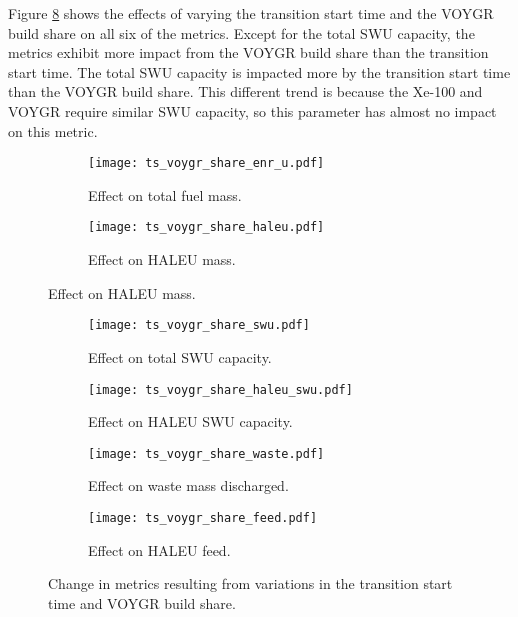 Figure \ref{fig:ts_voygr_share} shows the effects of varying the 
transition start time and the VOYGR build share on all six of the 
metrics. Except for the total \gls{SWU} capacity, the metrics 
exhibit more impact from the VOYGR build share than the 
transition start time. The total \gls{SWU} capacity is impacted more 
by the transition start time than the VOYGR build share. This
different trend is because the Xe-100 and VOYGR require similar 
\gls{SWU} capacity, so this parameter has almost no impact on 
this metric. 

\begin{figure}
    \begin{subfigure}[t]{0.48\textwidth}
        \centering
        \texttt{[image: ts\_voygr\_share\_enr\_u.pdf]}
        \caption{Effect on total fuel mass.}
        \label{fig:ts_voygr_share_enr_u}
    \end{subfigure}
    \hfill
    \begin{subfigure}[t]{0.48\textwidth}
        \centering
        \texttt{[image: ts\_voygr\_share\_haleu.pdf]}
        \caption{Effect on HALEU mass.}
        \label{fig:ts_voygr_share_haleu}
    \end{subfigure}
\end{figure}

\begin{figure}
    \ContinuedFloat
    \begin{subfigure}[t]{0.48\textwidth}
        \centering
        \texttt{[image: ts\_voygr\_share\_swu.pdf]}
        \caption{Effect on total SWU capacity.}
        \label{fig:ts_voygr_share_swu}
    \end{subfigure}
    \hfill
    \begin{subfigure}[t]{0.48\textwidth}
        \centering
        \texttt{[image: ts\_voygr\_share\_haleu\_swu.pdf]}
        \caption{Effect on HALEU SWU capacity.}
        \label{fig:ts_voygr_share_haleu_swu}
    \end{subfigure}
    
    \begin{subfigure}[t]{0.48\textwidth}
        \centering
        \texttt{[image: ts\_voygr\_share\_waste.pdf]}
        \caption{Effect on waste mass discharged.}
        \label{fig:ts_voygr_share_waste}
    \end{subfigure}
    \hfill
    \begin{subfigure}[t]{0.48\textwidth}
        \centering
        \texttt{[image: ts\_voygr\_share\_feed.pdf]}
        \caption{Effect on HALEU feed.}
        \label{fig:ts_voygr_share_feed}
    \end{subfigure}
    \caption{Change in metrics resulting from variations in the 
    transition start time and VOYGR build share.}
    \label{fig:ts_voygr_share}
\end{figure}

